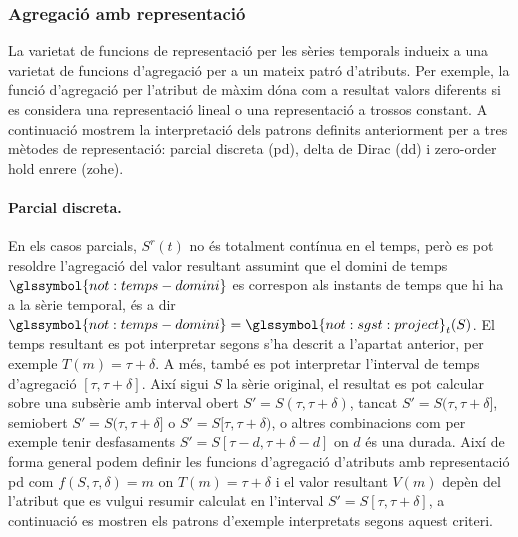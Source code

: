 





\subsubsection{Agregació amb representació}

La varietat de funcions de representació per les sèries temporals
indueix a una varietat de funcions d'agregació per a un mateix patró
d'atributs. Per exemple, la funció d'agregació per l'atribut de màxim
dóna com a resultat valors diferents si es considera una representació
lineal o una representació a trossos constant. A continuació mostrem
la interpretació dels patrons definits anteriorment per a tres mètodes
de representació: parcial discreta (\gls{pd}), delta de Dirac
(\gls{dd}) i zero-order hold enrere (\gls{zohe}).



\paragraph{Parcial discreta.}
En els casos parcials, $S^r(t)$ no és totalment contínua en el temps,
però es pot resoldre l'agregació del valor resultant assumint que el
domini de temps $\glssymbol{not:temps-domini}$ es correspon als
instants de temps que hi ha a la sèrie temporal, és a dir
$\glssymbol{not:temps-domini}=\glssymbol{not:sgst:project}_{t}(S)$.
El temps resultant es pot interpretar segons s'ha descrit a l'apartat
anterior, per exemple $T(m)=\tau+\delta$. A més, també es pot
interpretar l'interval de temps d'agregació $[\tau,\tau+\delta]$. Així
sigui $S$ la sèrie original, el resultat es pot calcular sobre una
subsèrie amb interval obert $S'=S(\tau,\tau+\delta)$, tancat
$S'=S(\tau,\tau+\delta]$, semiobert $S'=S(\tau,\tau+\delta]$ o
$S'=S[\tau,\tau+\delta)$, o altres combinacions com per exemple tenir
desfasaments $S'=S[\tau-d,\tau+\delta-d]$ on $d$ és una durada.  Així
de forma general podem definir les funcions d'agregació d'atributs amb
representació \gls{pd} com $f(S,\tau,\delta)=m$ on $T(m)=\tau+\delta$
i el valor resultant $V(m)$ depèn del l'atribut que es vulgui resumir
calculat en l'interval $S'=S[\tau,\tau+\delta]$, a continuació es mostren els
patrons d'exemple interpretats segons aquest criteri.

